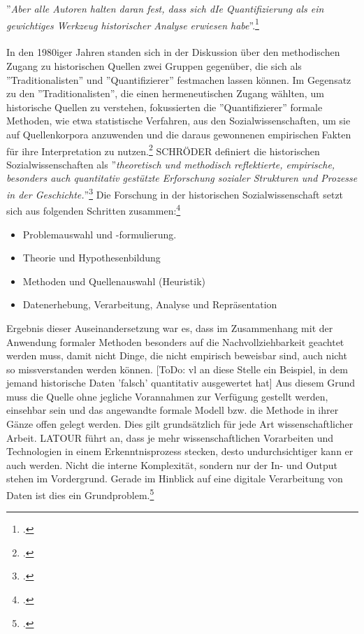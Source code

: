 \documentclass[12pt,a4paper]{article}
\begin{document}
''\textit{Aber alle Autoren halten daran fest, dass sich dIe Quantifizierung als ein gewichtiges Werkzeug historischer Analyse erwiesen habe}''.\footcite[][S.191-206]{jarausch1985quantitative}
\\
\\
In den 1980iger Jahren standen sich in der Diskussion über den methodischen Zugang zu historischen Quellen zwei Gruppen gegenüber, die sich als ''Traditionalisten'' und ''Quantifizierer'' festmachen lassen können. Im Gegensatz zu den ''Traditionalisten'', die einen hermeneutischen Zugang wählten, um historische Quellen zu verstehen, fokussierten die ''Quantifizierer'' formale Methoden, wie etwa statistische Verfahren, aus den Sozialwissenschaften, um sie auf Quellenkorpora anzuwenden und die daraus gewonnenen empirischen Fakten für ihre Interpretation zu nutzen.\footcite[][S.191-206]{jarausch1985quantitative} 
SCHRÖDER definiert die historischen Sozialwissenschaften als
 ''\textit{theoretisch und methodisch reflektierte, empirische, besonders auch quantitativ gestützte Erforschung sozialer Strukturen und Prozesse in der Geschichte.}''\footcite[Vgl.][S.5]{schroder1988historische} Die Forschung in der historischen Sozialwissenschaft setzt sich aus folgenden Schritten zusammen:\footcite[Vgl.][S.5-8]{schroder1988historische} 
 \begin{itemize}
 \item Problemauswahl und -formulierung.
 \item Theorie und Hypothesenbildung
 \item Methoden und Quellenauswahl (Heuristik)
 \item Datenerhebung, Verarbeitung, Analyse und Repräsentation
 \end{itemize}
Ergebnis dieser Auseinandersetzung war es, dass im Zusammenhang mit der Anwendung formaler Methoden besonders auf die Nachvollziehbarkeit geachtet werden muss, damit nicht Dinge, die nicht empirisch beweisbar sind, auch nicht so missverstanden werden können. [ToDo: vl an diese Stelle ein Beispiel, in dem jemand historische Daten 'falsch' quantitativ ausgewertet hat] Aus diesem Grund muss die Quelle ohne jegliche Vorannahmen zur Verfügung gestellt werden, einsehbar sein und das angewandte formale Modell bzw. die Methode in ihrer Gänze offen gelegt werden. Dies gilt grundsätzlich für jede Art wissenschaftlicher Arbeit. LATOUR führt an, dass je mehr wissenschaftlichen Vorarbeiten und Technologien in einem Erkenntnisprozess stecken, desto undurchsichtiger kann er auch werden. Nicht die interne Komplexität, sondern nur der In- und Output stehen im Vordergrund. Gerade im Hinblick auf eine digitale Verarbeitung von Daten ist dies ein Grundproblem.\footcite[][S.309]{latour1999pandora} 
\end{document}
